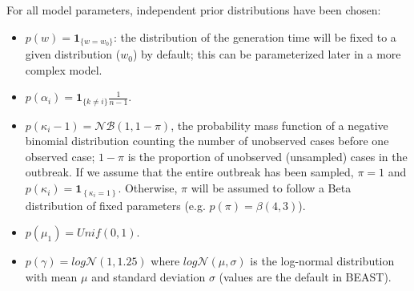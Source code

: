 \documentclass[10pt]{article}
\begin{document}
For all model parameters, independent prior distributions have been chosen:
\begin{itemize}
	\item $p(w) = \mathbf{1}_{\{w=w_0\}}$: the distribution of the generation time will be fixed to a given distribution ($w_0$) by default; this can be parameterized later in a more complex model.
	\item $p(\alpha_i) = \mathbf{1}_{\{k\neq i\}}\frac{1}{n-1}$.
	\item $p(\kappa_i - 1) = \mathcal{NB}(1,1-\pi)$, the probability mass function of a negative binomial distribution counting the number of unobserved cases before one observed case; $1-\pi$ is the proportion of unobserved (unsampled) cases in the outbreak. If we assume that the entire outbreak has been sampled, $\pi=1$ and $p(\kappa_i) = \mathbf{1}_{\left\lbrace \kappa_i=1\right\rbrace}$. Otherwise, $\pi$ will be assumed to follow a Beta distribution of fixed parameters (e.g. $p(\pi) = \beta(4,3)$).
	\item $p(\mu_1) = Unif(0,1)$.
	\item $p(\gamma) = log\mathcal{N}(1,1.25)$ where $log\mathcal{N}(\mu,\sigma)$ is the log-normal distribution with mean $\mu$ and standard deviation $\sigma$ (values are the default in BEAST).
\end{itemize}






%   
% 
\end{document}
